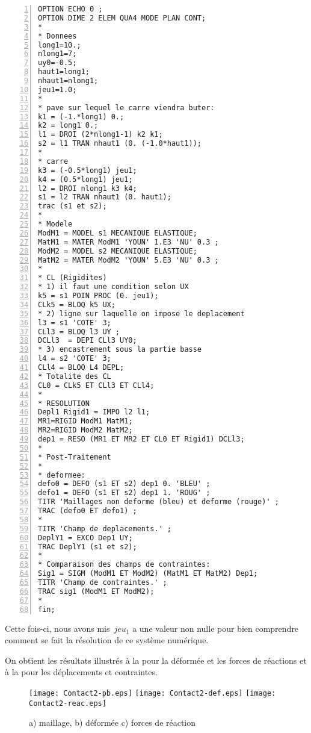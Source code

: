 \color{gris}\scriptsize
\begin{multicols}{2}
\begin{Verbatim}[numbers=left,numbersep=3pt]
OPTION ECHO 0 ;
OPTION DIME 2 ELEM QUA4 MODE PLAN CONT;
*
* Donnees
long1=10.;
nlong1=7;
uy0=-0.5;
haut1=long1;
nhaut1=nlong1;
jeu1=1.0;
*
* pave sur lequel le carre viendra buter:
k1 = (-1.*long1) 0.;
k2 = long1 0.;
l1 = DROI (2*nlong1-1) k2 k1;
s2 = l1 TRAN nhaut1 (0. (-1.0*haut1));
*
* carre
k3 = (-0.5*long1) jeu1;
k4 = (0.5*long1) jeu1;
l2 = DROI nlong1 k3 k4;
s1 = l2 TRAN nhaut1 (0. haut1);
trac (s1 et s2);
*
* Modele
ModM1 = MODEL s1 MECANIQUE ELASTIQUE;
MatM1 = MATER ModM1 'YOUN' 1.E3 'NU' 0.3 ;
ModM2 = MODEL s2 MECANIQUE ELASTIQUE;
MatM2 = MATER ModM2 'YOUN' 5.E3 'NU' 0.3 ;
*
* CL (Rigidites)
* 1) il faut une condition selon UX
k5 = s1 POIN PROC (0. jeu1);
CLk5 = BLOQ k5 UX;
* 2) ligne sur laquelle on impose le deplacement
l3 = s1 'COTE' 3;
CLl3 = BLOQ l3 UY ;
DCLl3  = DEPI CLl3 UY0;
* 3) encastrement sous la partie basse
l4 = s2 'COTE' 3;
CLl4 = BLOQ L4 DEPL;
* Totalite des CL
CL0 = CLk5 ET CLl3 ET CLl4;
*
* RESOLUTION
Depl1 Rigid1 = IMPO l2 l1;
MR1=RIGID ModM1 MatM1;
MR2=RIGID ModM2 MatM2;
dep1 = RESO (MR1 ET MR2 ET CL0 ET Rigid1) DCLl3;
*
* Post-Traitement
*
* deformee:
defo0 = DEFO (s1 ET s2) dep1 0. 'BLEU' ;
defo1 = DEFO (s1 ET s2) dep1 1. 'ROUG' ;
TITR 'Maillages non deforme (bleu) et deforme (rouge)' ;
TRAC (defo0 ET defo1) ;
*
TITR 'Champ de deplacements.' ;
DeplY1 = EXCO Dep1 UY;
TRAC DeplY1 (s1 et s2);
*
* Comparaison des champs de contraintes:
Sig1 = SIGM (ModM1 ET ModM2) (MatM1 ET MatM2) Dep1;
TITR 'Champ de contraintes.' ;
TRAC sig1 (ModM1 ET ModM2);
*
fin;
\end{Verbatim}
\end{multicols}
\color{black}\normalsize

\medskip
Cette fois-ci, nous avons mis~$jeu_1$ a une valeur non nulle pour bien comprendre
comment se fait la résolution de ce système numérique.

On obtient les résultats illustrés à la  pour la déformée et les forces de réactions et à la 
pour les déplacements et contraintes.

\begin{figure}[ht]
  \texttt{[image: Contact2-pb.eps]} \hfill 
  \texttt{[image: Contact2-def.eps]}\hfill 
  \texttt{[image: Contact2-reac.eps]}
  \caption{\label{Fig-Cont21} a) maillage, b) déformée c) forces de réaction}
\end{figure}

